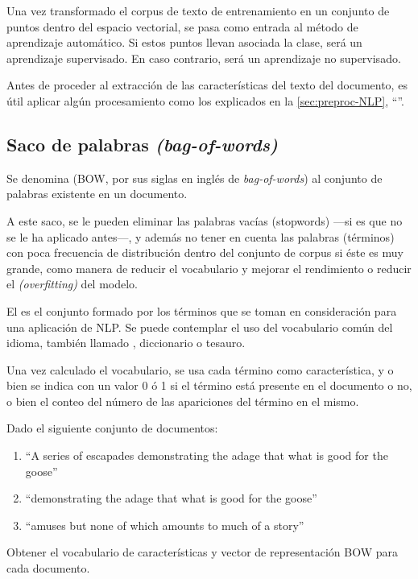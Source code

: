 Una vez transformado el corpus de texto de entrenamiento en un conjunto de puntos dentro del espacio vectorial, se pasa como entrada al método de aprendizaje automático. Si estos puntos llevan asociada la clase, será un aprendizaje supervisado. En caso contrario, será un aprendizaje no supervisado.

Antes de proceder al extracción de las características del texto del documento, es útil aplicar algún procesamiento como los explicados en la \autoref{sec:preproc-NLP}, ``''.

\FloatBarrier
\subsection{Saco de palabras \emph{(bag-of-words)}}

\begin{definition}
Se denomina  (BOW, por sus siglas en inglés de \emph{bag-of-words}) al conjunto de palabras existente en un documento.
\end{definition}

A este saco, se le pueden eliminar las palabras vacías (stopwords) ---si es que no se le ha aplicado antes---, y además no tener en cuenta las palabras (términos) con poca frecuencia de distribución dentro del conjunto de corpus si éste es muy grande, como manera de reducir el vocabulario y mejorar el rendimiento o reducir el  \emph{(overfitting)} del modelo.

\begin{definition}[vocabulario]
El  es el conjunto formado por los términos que se toman en consideración para una aplicación de NLP. Se puede contemplar el uso del vocabulario común del idioma, también llamado , diccionario o tesauro.
\end{definition}

Una vez calculado el vocabulario, se usa cada término como característica, y o bien se indica con un valor 0 ó 1 si el término está presente en el documento o no, o bien el conteo del número de las apariciones del término en el mismo.

\begin{example}\label{exa:ml-bow}
Dado el siguiente conjunto de documentos:
\begin{enumerate}
\item ``A series of escapades demonstrating the adage that what is good for the goose''
\item ``demonstrating the adage that what is good for the goose''
\item ``amuses but none of which amounts to much of a story''
\end{enumerate}
Obtener el vocabulario de características y vector de representación BOW para cada documento.
\end{example}

